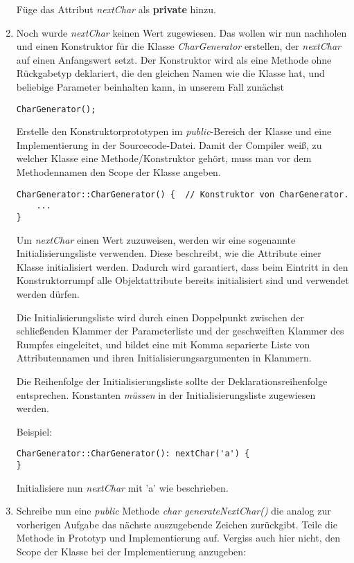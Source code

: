 \documentclass[
  accentcolor=tud1c,	%
  colorbacktitle,		%
  inverttitle,			%
  german,				%
  twoside
]{tudexercise}
\begin{document}
\begin{enumerate}
Füge das Attribut \emph{nextChar} als \textbf{private} hinzu.

\item
Noch wurde \emph{nextChar} keinen Wert zugewiesen.
Das wollen wir nun nachholen und einen Konstruktor für die Klasse \emph{CharGenerator} erstellen, der \emph{nextChar} auf einen Anfangswert setzt.
Der Konstruktor wird als eine Methode ohne Rückgabetyp deklariert, die den gleichen Namen wie die Klasse hat, und beliebige Parameter beinhalten kann, in unserem Fall zunächst 
\begin{lstlisting}
CharGenerator();
\end{lstlisting}

Erstelle den Konstruktorprototypen im \emph{public}-Bereich der Klasse und eine Implementierung in der Sourcecode-Datei. Damit der Compiler weiß, zu welcher Klasse eine Methode/Konstruktor gehört, muss man vor dem Methodennamen den Scope der Klasse angeben.

\begin{lstlisting}
CharGenerator::CharGenerator() {  // Konstruktor von CharGenerator.
	...
}
\end{lstlisting}

Um \emph{nextChar} einen Wert zuzuweisen, werden wir eine sogenannte Initialisierungsliste verwenden.
Diese beschreibt, wie die Attribute einer Klasse initialisiert werden.
Dadurch wird garantiert, dass beim Eintritt in den Konstruktorrumpf alle Objektattribute bereits initialisiert sind und verwendet werden dürfen.

Die Initialisierungsliste wird durch einen Doppelpunkt zwischen der schließenden Klammer der Parameterliste und der geschweiften Klammer des Rumpfes eingeleitet, und bildet eine mit Komma separierte Liste von Attributennamen und ihren Initialisierungsargumenten in Klammern.

Die Reihenfolge der Initialisierungsliste sollte der Deklarationsreihenfolge entsprechen.
Konstanten \emph{müssen} in der Initialisierungsliste zugewiesen werden.

Beispiel:

\begin{lstlisting}
CharGenerator::CharGenerator(): nextChar('a') {
}
\end{lstlisting}

Initialisiere nun \emph{nextChar} mit 'a' wie beschrieben.

\item
Schreibe nun eine \emph{public} Methode \emph{char generateNextChar()} die analog zur vorherigen Aufgabe das nächste auszugebende Zeichen zurückgibt.
Teile die Methode in Prototyp und Implementierung auf.
Vergiss auch hier nicht, den Scope der Klasse bei der Implementierung anzugeben:


\end{enumerate}
\end{document}
